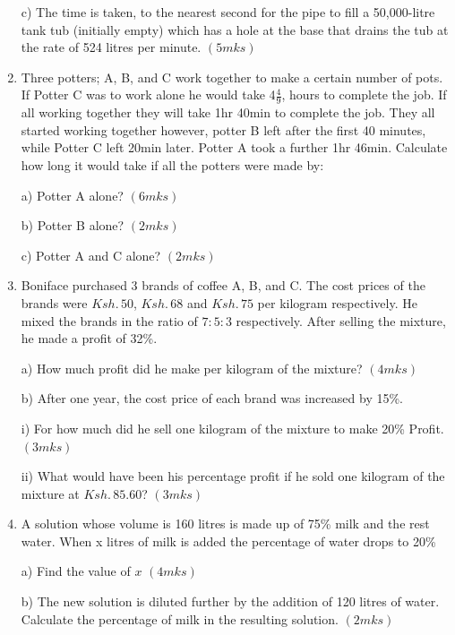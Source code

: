 \documentclass[
  a4paperpaper,
]{scrbook}
\begin{document}
\begin{tcolorbox}
\begin{enumerate}
  c) The time is taken, to the nearest second for the pipe to fill a
  50,000-litre tank tub (initially empty) which has a hole at the base
  that drains the tub at the rate of 524 litres per minute.
  \hspace{13.5 cm} \((5mks)\)
\item
  Three potters; A, B, and C work together to make a certain number of
  pots. If Potter C was to work alone he would take 4\(\frac{4}{9}\),
  hours to complete the job. If all working together they will take 1hr
  40min to complete the job. They all started working together however,
  potter B left after the first 40 minutes, while Potter C left 20min
  later. Potter A took a further 1hr 46min. Calculate how long it would
  take if all the potters were made by:

  a) Potter A alone? \hspace{10.8 cm} \((6mks)\)

  b) Potter B alone? \hspace{10.8 cm} \((2mks)\)

  c) Potter A and C alone? \hspace{9.8 cm} \((2mks)\)
\item
  Boniface purchased 3 brands of coffee A, B, and C. The cost prices of
  the brands were \(Ksh.\, 50\), \(Ksh.\, 68\) and \(Ksh. \,75\) per
  kilogram respectively. He mixed the brands in the ratio of \(7:5:3\)
  respectively. After selling the mixture, he made a profit of 32\%.

  a) How much profit did he make per kilogram of the mixture?
  \hspace{4 cm} \((4mks)\)

  b) After one year, the cost price of each brand was increased by 15\%.

  i) For how much did he sell one kilogram of the mixture to make 20\%
  Profit.\hspace{1.3cm} \((3mks)\)

  ii) What would have been his percentage profit if he sold one kilogram
  of the mixture at \(Ksh. \,85.60\)? \hspace{10.6 cm} \((3mks)\)
\item
  A solution whose volume is 160 litres is made up of 75\% milk and the
  rest water. When x litres of milk is added the percentage of water
  drops to 20\%

  a) Find the value of \(x\) \hspace{10.4 cm} \((4mks)\)

  b) The new solution is diluted further by the addition of 120 litres
  of water. Calculate the percentage of milk in the resulting solution.
  \hspace{7.7 cm} \((2mks)\)


\end{enumerate}
\end{tcolorbox}
\end{document}
